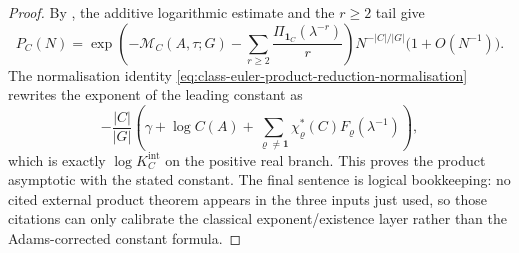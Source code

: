 \documentclass[11pt,a4paper]{amsart}
\theoremstyle{plain}
\theoremstyle{definition}
\theoremstyle{remark}
\begin{document}
\begin{proof}
  By , the additive
  logarithmic estimate and the \(r\ge2\) tail give
  \[
    P_C(N)=
    \exp\!\left(
      -\mathcal M_C(A,\tau;G)
      -\sum_{r\ge2}\frac{\Pi_{\mathbf1_C}(\lambda^{-r})}{r}
    \right)
    N^{-|C|/|G|}\bigl(1+O(N^{-1})\bigr).
  \]
  The normalisation identity
  \eqref{eq:class-euler-product-reduction-normalisation} rewrites the exponent
  of the leading constant as
  \[
    -\frac{|C|}{|G|}
    \left(
      \gamma+
      \log C(A)+
      \sum_{\varrho\ne\mathbf1}
        \chi_\varrho^\ast(C)F_\varrho(\lambda^{-1})
    \right),
  \]
  which is exactly \(\log K_C^{\mathrm{int}}\) on the positive real branch.
  This proves the product asymptotic with the stated constant.  The final
  sentence is logical bookkeeping: no cited external product theorem appears in
  the three inputs just used, so those citations can only calibrate the
  classical exponent/existence layer rather than the Adams-corrected constant formula.
\end{proof}
\end{document}
